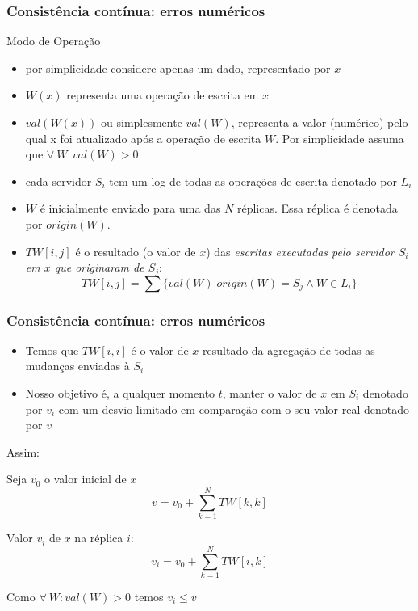 \documentclass[Ligatures=TeX,table,brazil,svgnames,usetotalslideindicator,compress,10pt]{beamer}
\begin{document}
\begin{frame}
  \frametitle{Consistência contínua: erros numéricos}
  \begin{block}{Modo de Operação}
    \begin{itemize}

    \item por simplicidade considere apenas um dado, representado por \alert{$x$}

    \item \alert{$W(x)$} representa uma operação de escrita em $x$

    \item \alert{$val(W(x))$} ou simplesmente \alert{$val(W)$}, representa a valor
      (numérico) pelo qual x foi atualizado após a operação de escrita
      $W$. Por simplicidade assuma que \alert{$\forall~W: val(W) > 0$}

    \item cada servidor $S_i$ tem um log de todas as operações de
      escrita denotado por \alert{$L_i$}

    \item $W$ é inicialmente enviado para uma das $N$ réplicas. Essa
      réplica é denotada por \alert{$origin(W)$}.
    \item \alert{$TW[i,j]$} é o resultado (o valor de $x$) das \emph{escritas
        executadas pelo servidor $S_i$ em $x$ que originaram de
        $S_j$}:
        \[TW[i,j] = \sum \{ val(W) | origin(W) = S_j \wedge  W \in L_i \}\]
    \end{itemize}
  \end{block}
\end{frame}

\begin{frame}
  \frametitle{Consistência contínua: erros numéricos}

  \begin{itemize}
  \item Temos que \alert{$TW[i,i]$} é o valor de $x$ resultado da
    agregação de todas as mudanças enviadas à $S_i$
  \item Nosso objetivo é, a qualquer momento \alert{$t$}, manter o
    valor de $x$ em $S_i$ denotado por \alert{$v_i$} com um desvio
    limitado em comparação com o seu valor real denotado por
    \alert{$v$}
  \end{itemize}

  \begin{alertblock}{Assim:}

    Seja \alert{$v_0$} o valor inicial de $x$
    \hspace{-0.5em}
    \[v = v_0 + \sum_{k=1}^N TW[k,k]\]

    Valor $v_i$ de $x$ na réplica $i$:
    \hspace{-0.5em}
    \[v_i = v_0 + \sum_{k=1}^N TW[i,k]\]

    Como $\forall~W: val(W) > 0$ temos $v_i \leq v$
  \end{alertblock}
\end{frame}
\end{document}
